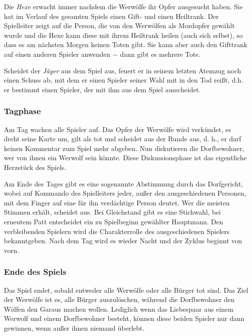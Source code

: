\documentclass[12pt]{article}
\begin{document}
\vspace{0,3 cm}

Die \textit{Hexe} erwacht immer nachdem die Werwölfe ihr Opfer ausgesucht haben.
Sie hat im Verlauf des gesamten Spiels einen Gift- und einen Heiltrank.
Der Spielleiter zeigt auf die Person, die von den Werwölfen als Mordopfer gewählt wurde und die
Hexe kann diese mit ihrem Heiltrank heilen (auch sich selbst), so dass es am nächsten Morgen keinen
Toten gibt. Sie kann aber auch den Gifttrank auf einen anderen Spieler anwenden $-$ dann gibt es mehrere Tote.

\vspace{0,3 cm} 

Scheidet der \textit{Jäger} aus dem Spiel aus, feuert er in seinem letzten Atemzug noch einen Schuss ab,
mit dem er einen Spieler seiner Wahl mit in den Tod reißt, d.h. er bestimmt einen Spieler,
der mit ihm aus dem Spiel ausscheidet.

\subsubsection{Tagphase}
Am Tag wachen alle Spieler auf. Das Opfer der Werwölfe wird verkündet, es dreht seine Karte um,
gilt als tot und scheidet aus der Runde aus, d. h., er darf keinen Kommentar zum Spiel mehr abgeben.
Nun diskutieren die Dorfbewohner, wer von ihnen ein Werwolf sein könnte. Diese Diskussionsphase
ist das eigentliche Herzstück des Spiels.

\vspace{0,3 cm}
Am Ende des Tages gibt es eine sogenannte Abstimmung durch das Dorfgericht, wobei auf Kommando des
Spielleiters jeder, außer den ausgeschiedenen Personen, mit dem Finger auf eine für ihn verdächtige
Person deutet. Wer die meisten Stimmen erhält, scheidet aus. Bei Gleichstand gibt es eine Stichwahl,
bei erneutem Patt entscheidet ein zu Spielbeginn gewählter Hauptmann. Den verbleibenden Spielern
wird die Charakterrolle des ausgeschiedenen Spielers bekanntgeben. Nach dem Tag wird es wieder
Nacht und der Zyklus beginnt von vorn.

\subsubsection{Ende des Spiels}
Das Spiel endet, sobald entweder alle Werwölfe oder alle Bürger tot sind.
Das Ziel der Werwölfe ist es, alle Bürger auszulöschen, während die Dorfbewohner den Wölfen den
Garaus machen wollen. Lediglich wenn das Liebespaar aus einem Werwolf und einem Dorfbewohner besteht,
können diese beiden Spieler nur dann gewinnen, wenn außer ihnen niemand überlebt.
\end{document}
